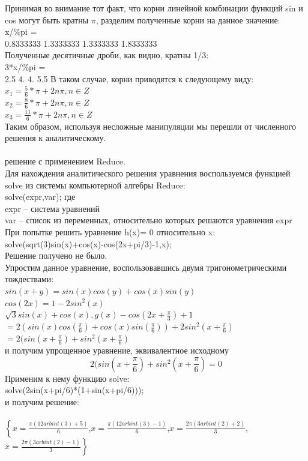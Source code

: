 \documentclass[russian,utf8,nocolumnxxxi,nocolumnxxxii]{eskdtext}
\begin{document}
Принимая во внимание тот факт, что корни линейной комбинации функций sin и cos могут быть кратны $\pi$, разделим полученные корни на данное значение:\\
x/\%pi =\\
0.8333333 1.3333333 1.3333333 1.8333333\\
Полученные десятичные дроби, как видно, кратны 1/3:\\
3*x/\%pi =
\\2.5 4. 4. 5.5
\newpage
В таком случае, корни приводятся к следующему виду:\\
$x_1=\frac{5}{6}*\pi+2n\pi,n\in Z$\\
$x_2=\frac{8}{6}*\pi+2n\pi,n\in Z$\\
$x_3=\frac{11}{6}*\pi+2n\pi,n\in Z$\\
Таким образом, используя несложные манипуляции мы перешли от численного решения к аналитическому.\\
\\
{ решение с применением Reduce.}\\
Для нахождения аналитического решения уравнения воспользуемся функцией solve из системы компьютерной алгебры Reduce:\\
solve(expr,var); где\\
expr – система уравнений\\
var – список из переменных, относительно которых решаются уравнения expr\\

При попытке решить уравнение h(x)= 0 относительно x:\\
solve(sqrt(3)sin(x)+cos(x)-cos(2x+pi/3)-1,x);\\
Решение получено не было.\\
Упростим данное уравнение, воспользовавшись двумя тригонометрическими тождествами:\\ $sin(x+y)=sin(x)cos(y)+cos(x)sin(y)$\\
$cos(2x)=1-2sin^2(x)$\\
$\sqrt{3}sin(x)+cos(x),g(x)-cos(2x+\frac{\pi}{3})+1$\\ $=2(sin(x)cos(\frac{\pi}{6})+cos(x)sin(\frac{\pi}{6}))+2sin^2(x+\frac{\pi}{6})$\\ $=2(sin(x+\frac{\pi}{6})+sin^2(x+\frac{\pi}{6})$\\
и получим упрощенное уравнение, эквивалентное исходному
$$2(sin(x+\frac{\pi}{6})+sin^2(x+\frac{\pi}{6})=0$$
Применим к нему функцию solve:\\
solve(2sin(x+pi/6)*(1+sin(x+pi/6)));\\
и получим решение:\\
\\
$\left\{x=\frac{\pi(12arbint(3)+5)}{6}\right.$,$x=\frac{\pi(12arbint(3)-1)}{6}$,$x=\frac{2\pi(3arbint(2)+2)}{3}$,
$\left.x=\frac{2\pi(3arbint(2)-1)}{3}\right\}$\\
\\
\end{document}
